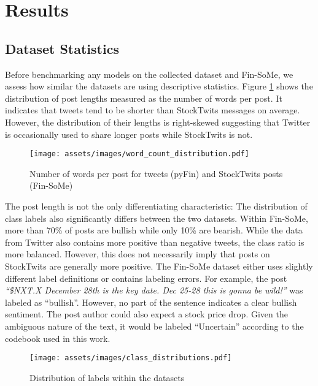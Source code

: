\section{Results}

\subsection{Dataset Statistics}
\label{section-dataset-diffs}
Before benchmarking any models on the collected dataset and Fin-SoMe, we assess how similar the datasets are using descriptive statistics. Figure \ref{figure-word-counts} shows the distribution of post lengths measured as the number of words per post. It indicates that tweets tend to be shorter than StockTwits messages on average. However, the distribution of their lengths is right-skewed suggesting that Twitter is occasionally used to share longer posts while StockTwits is not.


\begin{figure}[!ht]
	\texttt{[image: assets/images/word\_count\_distribution.pdf]}
	\caption{Number of words per post for tweets (pyFin) and StockTwits posts (Fin-SoMe)}
	\label{figure-word-counts}
\end{figure}

The post length is not the only differentiating characteristic: The distribution of class labels also significantly differs between the two datasets. Within Fin-SoMe, more than 70\% of posts are bullish while only 10\% are bearish. While the data from Twitter also contains more positive than negative tweets, the class ratio is more balanced. However, this does not necessarily imply that posts on StockTwits are generally more positive. The Fin-SoMe dataset either uses slightly different label definitions or contains labeling errors. For example, the post \emph{``\$NXT.X December 28th is the key date. Dec 25-28 this is gonna be wild!''} was labeled as ``bullish''. However, no part of the sentence indicates a clear bullish sentiment. The post author could also expect a stock price drop. Given the ambiguous nature of the text, it would be labeled ``Uncertain'' according to the codebook used in this work.

\begin{figure}[!ht]
	\texttt{[image: assets/images/class\_distributions.pdf]}
	\caption{Distribution of labels within the datasets}
	\label{figure-class-distribution}
\end{figure}

